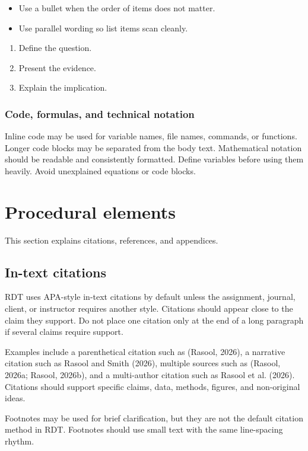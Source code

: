 \documentclass[11pt,letterpaper]{article}
\begin{document}
\begin{itemize}
\item Use a bullet when the order of items does not matter.
\item Use parallel wording so list items scan cleanly.
\end{itemize}

\begin{enumerate}
\item Define the question.
\item Present the evidence.
\item Explain the implication.
\end{enumerate}

\subsubsection{Code, formulas, and technical notation}

Inline code may be used for variable names, file names, commands, or
functions. Longer code blocks may be separated from the body text.
Mathematical notation should be readable and consistently formatted.
Define variables before using them heavily. Avoid unexplained equations
or code blocks.

\section{Procedural elements}

This section explains citations, references, and appendices.

\subsection{In-text citations}

RDT uses APA-style in-text citations by default unless the assignment,
journal, client, or instructor requires another style. Citations should
appear close to the claim they support. Do not place one citation only
at the end of a long paragraph if several claims require support.

Examples include a parenthetical citation such as (Rasool, 2026), a
narrative citation such as Rasool and Smith (2026), multiple sources
such as (Rasool, 2026a; Rasool, 2026b), and a multi-author citation
such as Rasool et al. (2026). Citations should support specific claims,
data, methods, figures, and non-original ideas.

Footnotes may be used for brief clarification, but they are not
the default citation method in RDT. Footnotes should use small text with
the same line-spacing rhythm.
\end{document}

